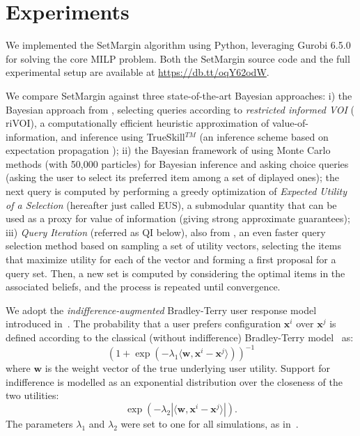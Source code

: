 \documentclass{article}
\renewcommand\[{\begin{equation}}
\renewcommand\]{\end{equation}}
\newcommand{\vecvar}[1]{\ensuremath{\boldsymbol{#1}}}
\newcommand{\vw}{\vecvar{w}}
\newcommand{\vx}{\vecvar{x}}
\begin{document}
\section{Experiments}
\label{sec:experiments}

We implemented the {\sc SetMargin} algorithm using Python, leveraging Gurobi
6.5.0 for solving the core MILP problem. Both the {\sc SetMargin} source code
and the full experimental setup are available at \url{https://db.tt/oqY62odW}.

We compare {\sc SetMargin} against three state-of-the-art Bayesian
approaches: i) the Bayesian approach from \cite{guo2010real},
selecting queries according to {\em restricted informed VOI} ({\sc
  riVOI}), a computationally efficient heuristic approximation of
value-of-information, and inference using TrueSkill$^{TM}$
\cite{HerbrichMG06} (an inference scheme based on expectation
propagation \cite{Minka01}); ii) the Bayesian framework of
\cite{viappiani2010optimal} using Monte Carlo methods (with 50,000 particles) for
Bayesian inference and asking choice queries (asking the user to
select its preferred item among a set of diplayed ones); the next
query is computed by performing a greedy optimization of {\em Expected
  Utility of a Selection} (hereafter just called {\sc EUS}), a
submodular quantity that can be used as a proxy for value of
information (giving strong approximate guarantees); iii) {\em Query
  Iteration} (referred as {\sc QI} below), also from
\cite{viappiani2010optimal}, an even faster query selection method
based on sampling a set of utility vectors, selecting the items that
maximize utility for each of the vector and forming a first proposal
for a query set. Then, a new set is computed by considering the
optimal items in the associated beliefs, and the process is repeated
until convergence.

We adopt the {\em indifference-augmented} Bradley-Terry user response
model introduced in~\cite{guo2010real}. The probability that a user
prefers configuration $\vx^i$ over $\vx^j$ is defined according to the
classical (without indifference) Bradley-Terry model~\cite{BraTer52} as:
%
$$ (1 + \exp(-\lambda_1 \langle\vw,\vx^i - \vx^j\rangle))^{-1} $$
%
where $\vw$ is the weight vector of the true underlying user utility.
Support for indifference is modelled as an exponential distribution
over the closeness of the two utilities:
%
$$ \exp(-\lambda_2 |\langle\vw,\vx^i - \vx^j\rangle|). $$
%
The parameters $\lambda_1$ and $\lambda_2$ were set to one for all
simulations, as in~\cite{guo2010real}.
\end{document}
